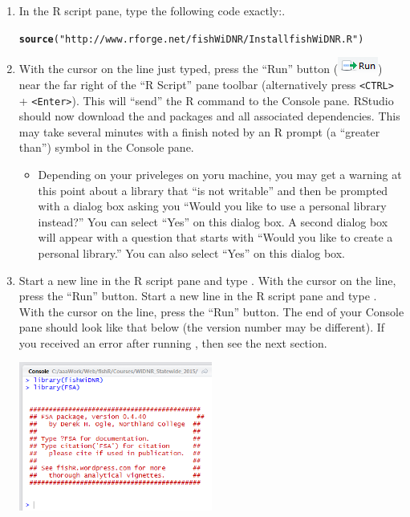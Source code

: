 \documentclass{article}\usepackage[]{graphicx}\usepackage[]{color}
\makeatletter
\newcommand{\hlstr}[1]{\textcolor[rgb]{0.192,0.494,0.8}{#1}}%
\newcommand{\hlstd}[1]{\textcolor[rgb]{0.345,0.345,0.345}{#1}}%
\newcommand{\hlkwd}[1]{\textcolor[rgb]{0.737,0.353,0.396}{\textbf{#1}}}%
\newenvironment{kframe}{%
 \def\at@end@of@kframe{}%
 \ifinner\ifhmode%
  \def\at@end@of@kframe{\end{minipage}}%
  \begin{minipage}{\columnwidth}%
 \fi\fi%
 \def\FrameCommand##1{\hskip\@totalleftmargin \hskip-\fboxsep
 \colorbox{shadecolor}{##1}\hskip-\fboxsep
     \hskip-\linewidth \hskip-\@totalleftmargin \hskip\columnwidth}%
 \MakeFramed {\advance\hsize-\width
   \@totalleftmargin\z@ \linewidth\hsize
   \@setminipage}}%
 {\par\unskip\endMakeFramed%
 \at@end@of@kframe}
\newenvironment{knitrout}{}{} %
\makeatother
\begin{document}
\begin{enumerate}
  \item In the R script pane, type the following code exactly:.
\begin{knitrout}
\color{fgcolor}\begin{kframe}
\begin{alltt}
\hlkwd{source}\hlstd{(}\hlstr{"http://www.rforge.net/fishWiDNR/InstallfishWiDNR.R"}\hlstd{)}
\end{alltt}
\end{kframe}
\end{knitrout}
\vspace{12pt}
  \item With the cursor on the line just typed, press the ``Run'' button (\includegraphics[scale=0.8]{Figs/RStudio_Icon_Run.png}) near the far right of the ``R Script'' pane toolbar (alternatively press \verb+<CTRL>+ + \verb+<Enter>+).  This will ``send'' the R command to the Console pane.  RStudio should now download  the  and  packages and all associated dependencies.  This may take several minutes with a finish noted by an R prompt (a ``greater than'') symbol in the Console pane.
  \begin{itemize}
    \item Depending on your priveleges on yoru machine, you may get a warning at this point about a library that ``is not writable'' and then be prompted with a dialog box asking you ``Would you like to use a personal library instead?''  You can select ``Yes'' on this dialog box.  A second dialog box will appear with a question that starts with ``Would you like to create a personal library.''  You can also select ``Yes'' on this dialog box.
  \end{itemize}
  \item Start a new line in the R script pane and type .  With the cursor on the line, press the ``Run'' button.  Start a new line in the R script pane and type .  With the cursor on the line, press the ``Run'' button.  The end of your Console pane should look like that below (the version number may be different).  If you received an error after running , then see the next section.
\begin{center}
  \includegraphics[width=2.5in]{Figs/RStudio_Prep_FSA.png}
\end{center}


\end{enumerate}
\end{document}
